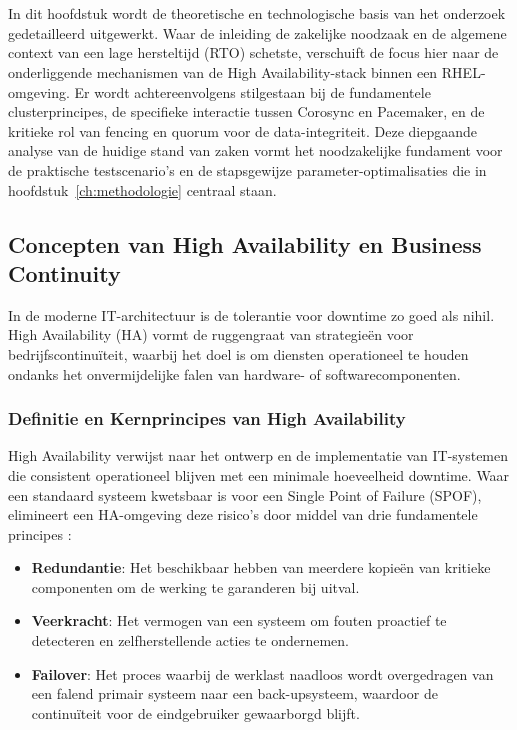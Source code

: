 \chapter{}%
\label{ch:stand-van-zaken}


In dit hoofdstuk wordt de theoretische en technologische basis van het onderzoek gedetailleerd uitgewerkt. Waar de inleiding de zakelijke noodzaak en de algemene context van een lage hersteltijd (RTO) schetste, verschuift de focus hier naar de onderliggende mechanismen van de High Availability-stack binnen een RHEL-omgeving. Er wordt achtereenvolgens stilgestaan bij de fundamentele clusterprincipes, de specifieke interactie tussen Corosync en Pacemaker, en de kritieke rol van fencing en quorum voor de data-integriteit. Deze diepgaande analyse van de huidige stand van zaken vormt het noodzakelijke fundament voor de praktische testscenario's en de stapsgewijze parameter-optimalisaties die in hoofdstuk~\ref{ch:methodologie} centraal staan.

\section{Concepten van High Availability en Business Continuity}
In de moderne IT-architectuur is de tolerantie voor downtime zo goed als nihil. High Availability (HA) vormt de ruggengraat van strategieën voor bedrijfscontinuïteit, waarbij het doel is om diensten operationeel te houden ondanks het onvermijdelijke falen van hardware- of softwarecomponenten.

\subsection{Definitie en Kernprincipes van High Availability}
High Availability verwijst naar het ontwerp en de implementatie van IT-systemen die consistent operationeel blijven met een minimale hoeveelheid downtime. Waar een standaard systeem kwetsbaar is voor een Single Point of Failure (SPOF), elimineert een HA-omgeving deze risico's door middel van drie fundamentele principes \autocite{Luca2024}:

\begin{itemize}
    \item \textbf{Redundantie}: Het beschikbaar hebben van meerdere kopieën van kritieke componenten om de werking te garanderen bij uitval.
    \item \textbf{Veerkracht}: Het vermogen van een systeem om fouten proactief te detecteren en zelfherstellende acties te ondernemen.
    \item \textbf{Failover}: Het proces waarbij de werklast naadloos wordt overgedragen van een falend primair systeem naar een back-upsysteem, waardoor de continuïteit voor de eindgebruiker gewaarborgd blijft.
\end{itemize}

